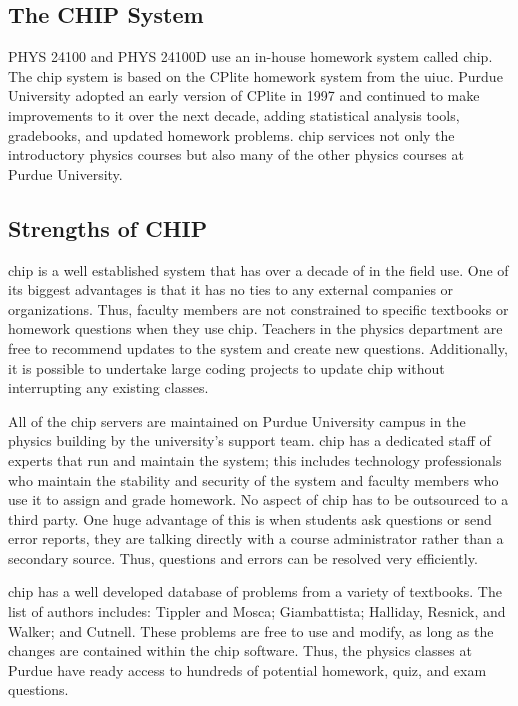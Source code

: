 \subsection{The CHIP System}

PHYS 24100 and PHYS 24100D use an in-house homework system called \gls{chip}. The \gls{chip} system is based on the CPlite homework system from the \gls{uiuc}. Purdue University adopted an early version of CPlite in 1997 and continued to make improvements to it over the next decade, adding statistical analysis tools, gradebooks, and updated homework problems. \gls{chip} services not only the introductory physics courses but also many of the other physics courses at Purdue University\cite{saxena1998}.

\subsection{Strengths of CHIP}

\gls{chip} is a well established system that has over a decade of in the field use. One of its biggest advantages is that it has no ties to any external companies or organizations. Thus, faculty members are not constrained to specific textbooks or homework questions when they use \gls{chip}. Teachers in the physics department are free to recommend updates to the system and create new questions. Additionally, it is possible to undertake large coding projects to update \gls{chip} without interrupting any existing classes.

All of the \gls{chip} servers are maintained on Purdue University campus in the physics building by the university's support team. \gls{chip} has a dedicated staff of experts that run and maintain the system; this includes technology professionals who maintain the stability and security of the system and faculty members who use it to assign and grade homework. No aspect of \gls{chip} has to be outsourced to a third party. One huge advantage of this is when students ask questions or send error reports, they are talking directly with a course administrator rather than a secondary source. Thus, questions and errors can be resolved very efficiently.

\gls{chip} has a well developed database of problems from a variety of textbooks. The list of authors includes: Tippler and Mosca\cite{tipler2003}; Giambattista\cite{giambattista2009}; Halliday, Resnick, and Walker\cite{hrw2013}; and Cutnell\cite{cutnell2009}. These problems are free to use and modify, as long as the changes are contained within the \gls{chip} software. Thus, the physics classes at Purdue have ready access to hundreds of potential homework, quiz, and exam questions.

